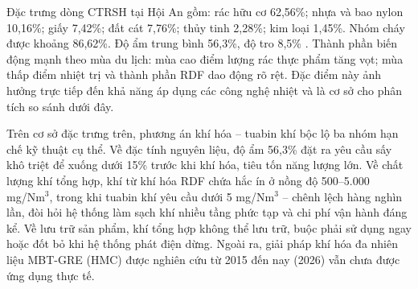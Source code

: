 \documentclass[../main.tex]{subfiles}
\begin{document}
\begin{table}[htbp]
\centering
\caption{Ý nghĩa kỹ thuật của các đặc tính CTRSH Hội An đối với lựa chọn công nghệ}
\label{tab:y-nghia-dac-tinh-rac-hoi-an}
\setlength{\tabcolsep}{5pt}
\end{table}

Đặc trưng dòng CTRSH tại Hội An gồm: rác hữu cơ 62,56\%; nhựa và bao nylon 10,16\%; giấy 7,42\%; đất cát 7,76\%; thủy tinh 2,28\%; kim loại 1,45\%. Nhóm cháy được khoảng 86,62\%. Độ ẩm trung bình 56,3\%, độ tro 8,5\% \cite{BaocaoHoiAn2024}. Thành phần biến động mạnh theo mùa du lịch: mùa cao điểm lượng rác thực phẩm tăng vọt; mùa thấp điểm nhiệt trị và thành phần RDF dao động rõ rệt. Đặc điểm này ảnh hưởng trực tiếp đến khả năng áp dụng các công nghệ nhiệt và là cơ sở cho phân tích so sánh dưới đây.

Trên cơ sở đặc trưng trên, phương án khí hóa -- tuabin khí bộc lộ ba nhóm hạn chế kỹ thuật cụ thể. Về đặc tính nguyên liệu, độ ẩm 56,3\% đặt ra yêu cầu sấy khô triệt để xuống dưới 15\% trước khi khí hóa, tiêu tốn năng lượng lớn. Về chất lượng khí tổng hợp, khí từ khí hóa RDF chứa hắc ín ở nồng độ 500--5.000 mg/Nm$^3$, trong khi tuabin khí yêu cầu dưới 5 mg/Nm$^3$ -- chênh lệch hàng nghìn lần, đòi hỏi hệ thống làm sạch khí nhiều tầng phức tạp và chi phí vận hành đáng kể. Về lưu trữ sản phẩm, khí tổng hợp không thể lưu trữ, buộc phải sử dụng ngay hoặc đốt bỏ khi hệ thống phát điện dừng. Ngoài ra, giải pháp khí hóa đa nhiên liệu MBT-GRE (HMC) được nghiên cứu từ 2015 đến nay (2026) vẫn chưa được ứng dụng thực tế.
\end{document}
